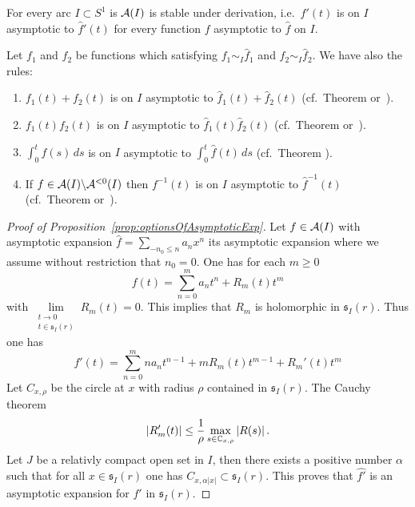 \begin{prop}\label{prop:optionsOfAsymptoticExp}
  For every arc $I\subset S^1$ is $\mathcal{A}(I)$ is stable under derivation, i.e.\
  $f'(t)$ is on $I$ asymptotic to $\hat f'(t)$ for every function $f$
  asymptotic to $\hat f$ on $I$.
  \begin{s-rem}
    Let $f_1$ and $f_2$ be functions which satisfying $f_1\sim_I\hat f_1$ and
    $f_2\sim_I\hat f_2$.
    We have also the rules:
    \begin{enumerate}
      \item $f_1(t)+f_2(t)$ is on $I$ asymptotic to $\hat f_1(t)+\hat f_2(t)$
        (cf.\ Theorem \cite[4.5.Thm.13]{Balser2000Formal}
        or~\cite[XI-1-6]{hsieh2012basic}).
      \item $f_1(t)f_2(t)$ is on $I$ asymptotic to $\hat f_1(t)\hat f_2(t)$
        (cf.\ Theorem \cite[4.5.Thm.14]{Balser2000Formal}
        or~\cite[XI-1-6]{hsieh2012basic}).
      \item $\int_0^tf(s)\,ds$ is on $I$ asymptotic to $\int_0^t\hat f(t)\,ds$
        (cf.\ Theorem \cite[4.5.Thm.20]{Balser2000Formal}).
      \item If $f\in\mathcal{A}(I)\backslash\mathcal{A}^{<0}(I)$ then $f^{-1}(t)$ is on $I$
        asymptotic to $\hat f^{-1}(t)$
        (cf.\ Theorem \cite[4.5.Thm.21]{Balser2000Formal}
        or~\cite[XI-1-9]{hsieh2012basic}).
    \end{enumerate}
  \end{s-rem}
\end{prop}
\begin{proof}[Proof of Proposition~\ref{prop:optionsOfAsymptoticExp}]
  Let $f\in\mathcal{A}(I)$ with asymptotic expansion $\hat f=\sum_{-n_0\leq n}a_nx^n$
  its asymptotic expansion where we assume without restriction that $n_0=0$.
  One has for each $m\geq0$
  \[
    f(t)=\sum_{n=0}^ma_nt^n+R_m(t)t^m
  \]
  with $\underset{\substack{t\to0\\t\in\mathfrak{s}_I(r)}}{\lim}R_m(t)=0$.
  This implies that $R_m$ is holomorphic in $\mathfrak{s}_I(r)$.
  Thus one has
  \[
    f'(t)=\sum_{n=0}^mna_nt^{n-1}+mR_m(t)t^{m-1}+R_m'(t)t^m
  \]
  Let $C_{x,\rho}$ be the circle at $x$ with radius $\rho$ contained in
  $\mathfrak{s}_I(r)$. The Cauchy theorem \rewrite{implies then that}
  \[
    |R_m'(t)|\leq\frac{1}{\rho}\max_{s\in\mathbb{C}_{x,\rho}}|R(s)| \,.
  \]
  Let $J$ be a relativly compact open set in $I$, then there exists a positive
  number $\alpha$ such that for all $x\in\mathfrak{s}_I(r)$ one has
  $C_{x,\alpha|x|}\subset\mathfrak{s}_I(r)$.
  \TODO{}
  This proves that $\hat{f'}$ is an asymptotic expansion for $f'$ in
  $\mathfrak{s}_I(r)$.
\end{proof}

